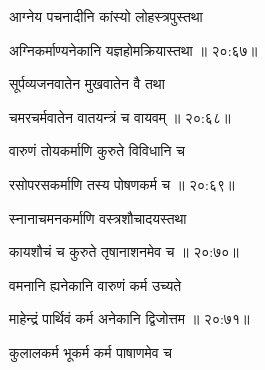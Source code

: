 {\devanagarifont आग्नेय पचनादीनि कांस्यो लोहस्त्रपुस्तथा \thinspace{\dandab} \dontdisplaylinenum }%


{\devanagarifont अग्निकर्माण्यनेकानि यज्ञहोमक्रियास्तथा {॥ २०:६७॥} \veg\dontdisplaylinenum }%
 
{\devanagarifont सूर्पव्यजनवातेन मुखवातेन वै तथा \thinspace{\dandab} \dontdisplaylinenum }%


{\devanagarifont चमरचर्मवातेन वातयन्त्रं च वायवम् {॥ २०:६८॥} \veg\dontdisplaylinenum }%
 
{\devanagarifont वारुणं तोयकर्माणि कुरुते विविधानि च \thinspace{\dandab} \dontdisplaylinenum }%


{\devanagarifont रसोपरसकर्माणि तस्य पोषणकर्म च {॥ २०:६९॥} \veg\dontdisplaylinenum }%
 
{\devanagarifont स्नानाचमनकर्माणि वस्त्रशौचादयस्तथा \thinspace{\dandab} \dontdisplaylinenum }%
 

{\devanagarifont कायशौचं च कुरुते तृषानाशनमेव च {॥ २०:७०॥} \veg\dontdisplaylinenum }%

{\devanagarifont वमनानि ह्यनेकानि वारुणं कर्म उच्यते \thinspace{\dandab} \dontdisplaylinenum }%


{\devanagarifont माहेन्द्रं पार्थिवं कर्म अनेकानि द्विजोत्तम {॥ २०:७१॥} \veg\dontdisplaylinenum }%
 
{\devanagarifont कुलालकर्म भूकर्म कर्म पाषाणमेव च \thinspace{\dandab} \dontdisplaylinenum }%

